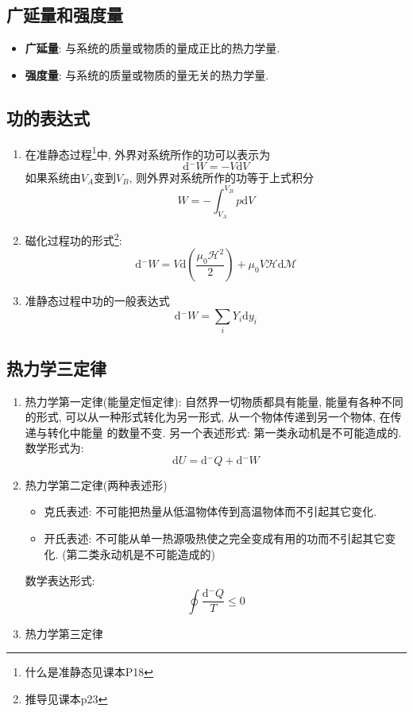 \subsection{广延量和强度量}
\begin{itemize}
    \item \textbf{广延量}: 与系统的质量或物质的量成正比的热力学量.
    \item \textbf{强度量}: 与系统的质量或物质的量无关的热力学量.
\end{itemize}
\subsection{功的表达式}

\begin{enumerate}
    \item 在准静态过程\footnote{什么是准静态见课本P18}中, 外界对系统所作的功可以表示为
          $$
              \mathrm{d}\!\!\!^-W=-V\mathrm{d}V
          $$
          如果系统由$V_A$变到$V_B$, 则外界对系统所作的功等于上式积分
          $$
              W=-\int_{V_A}^{V_B}p\mathrm{d}V
          $$

    \item 磁化过程功的形式\footnote{推导见课本p23}:
          $$
              \mathrm{d}\!\!\!^-W=V\mathrm{d}\left(\frac{\mu_0\mathcal{H}^2}{2}\right)+\mu_0V\mathcal{H}\mathrm{d}\mathcal{M}
          $$

    \item 准静态过程中功的一般表达式
          $$
              \mathrm{d}\!\!\!^-W=\sum_iY_i\mathrm{d}y_i
          $$
\end{enumerate}


\subsection{热力学三定律}
\begin{enumerate}
    \item 热力学第一定律(能量定恒定律): 自然界一切物质都具有能量, 能量有各种不同的形式,
          可以从一种形式转化为另一形式, 从一个物体传递到另一个物体, 在传递与转化中能量
          的数量不变. 另一个表述形式: 第一类永动机是不可能造成的. 数学形式为:
          $$
              \mathrm{d}U=\mathrm{d}\!\!\!^-Q+\mathrm{d}\!\!\!^-W
          $$

    \item 热力学第二定律(两种表述形)
          \begin{itemize}
              \item 克氏表述: 不可能把热量从低温物体传到高温物体而不引起其它变化.
              \item 开氏表述: 不可能从单一热源吸热使之完全变成有用的功而不引起其它变化. (第二类永动机是不可能造成的)
          \end{itemize}
          数学表达形式:
          $$
              \oint\frac{\mathrm{d}\!\!\!^-Q}{T}\leqslant 0
          $$

    \item 热力学第三定律
\end{enumerate}


